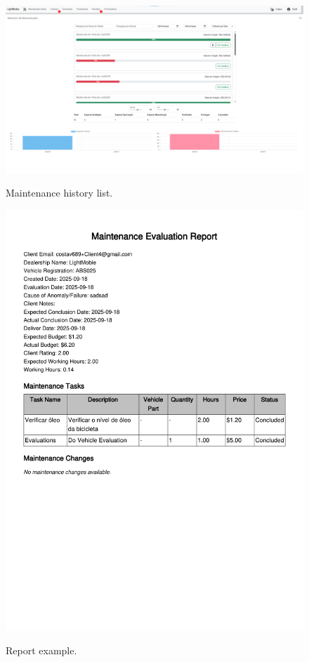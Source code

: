 \begin{figure}[h]
  \caption{Maintenance history list.}
  \centering
  \includegraphics[width=\textwidth]{figs/Implementation/workshopmanager/maintenanceHistory}
  \label{fig:maintenanceHistory}
\end{figure}

\begin{figure}[h]
  \caption{Report example.}
  \centering
  \includegraphics[width=\textwidth]{figs/Implementation/workshopmanager/report}
  \label{fig:report}
\end{figure}


